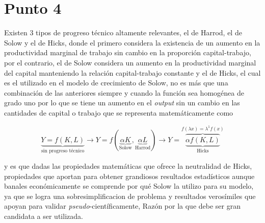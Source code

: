 \documentclass[11pt]{article}
\begin{document}
{\section{Punto 4}
\begin{flushleft}
    Existen 3 tipos de progreso técnico altamente relevantes, el de Harrod, el de Solow y el de Hicks, donde el primero considera
    la existencia de un aumento en la productividad marginal de trabajo sin cambio en la proporción capital-trabajo, por el contrario, el de Solow considera un aumento en la productividad
    marginal del capital manteniendo la relación capital-trabajo constante y el de Hicks, el cual es el utilizado en el modelo de crecimiento de Solow, 
    no es más que una combinación de las anteriores siempre y cuando la función sea homogénea de grado uno por lo que se tiene un aumento en el \textit{output}
    sin un cambio en las cantidades de capital o trabajo que se representa matemáticamente como

    \begin{equation}
        \underbrace{Y=f(K,L)}_{\text{sin progreso técnico}} \to Y=f(\underbrace{\alpha K}_{\text{Solow}},\underbrace{\alpha L}_{\text{Harrod}}) \to Y = \overbrace{\underbrace{\alpha f(K,L)}_{\text{Hicks}}}^{f(\lambda x) = \lambda^1 f(x)}
    \end{equation}

    y es que dadas las propiedades matemáticas que ofrece la neutralidad de Hicks, propiedades que aportan para obtener grandiosos resultados estadísticos aunque
    banales económicamente se comprende por qué Solow la utilizo para su modelo, ya que se logra una sobresimplificacion de problema y resultados verosímiles que apoyan para validar \textit{pseudo}-científicamente,
    Razón por la que debe ser gran candidata a ser utilizada.
\end{flushleft}

}
\end{document}
